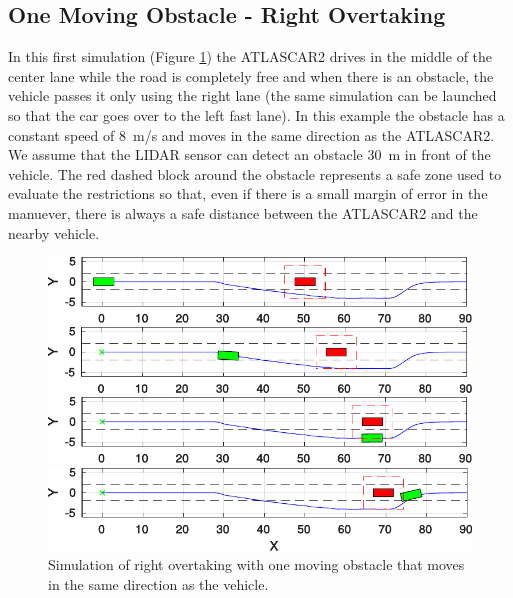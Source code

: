 \subsection{One Moving Obstacle - Right Overtaking}
In this first simulation
(Figure \ref{fig:obstacleAvoidance_one_obstacle}) the ATLASCAR2 drives in the middle of the center lane while the road is completely free and when there is an obstacle, the vehicle passes it only using the right lane (the same simulation can be launched so that the car goes over to the left fast lane). In this example the obstacle has a constant speed of \SI{8}{m/s} and moves in the same direction as the ATLASCAR2. We assume that the LIDAR sensor can detect an obstacle \SI{30}{m} in front of the vehicle.
The red dashed block around the obstacle represents a safe zone used to evaluate the restrictions so that, even if there is a small margin of error in the manuever, there is always a safe distance between the ATLASCAR2 and the nearby vehicle.
\begin{figure}[h!]
	\centering
	\begin{minipage}[t]{\textwidth}
		\includegraphics[width=\textwidth]{../figure/one_obstacle_right_overtaking/overtaking_start.pdf}
	\end{minipage}
	\begin{minipage}[t]{\textwidth}
		\includegraphics[width=\textwidth]{../figure/one_obstacle_right_overtaking/overtaking_middle.pdf}
	\end{minipage}
	\begin{minipage}[t]{\textwidth}
		\includegraphics[width=\textwidth]{../figure/one_obstacle_right_overtaking/overtaking_middle_end.pdf}
	\end{minipage}
	\begin{minipage}[t]{\textwidth}
		\includegraphics[width=\textwidth]{../figure/one_obstacle_right_overtaking/overtaking_end.pdf}
	\end{minipage}
	\caption{Simulation of right overtaking with one moving obstacle that moves in the same direction as the vehicle.}
	\label{fig:obstacleAvoidance_one_obstacle}
\end{figure}

